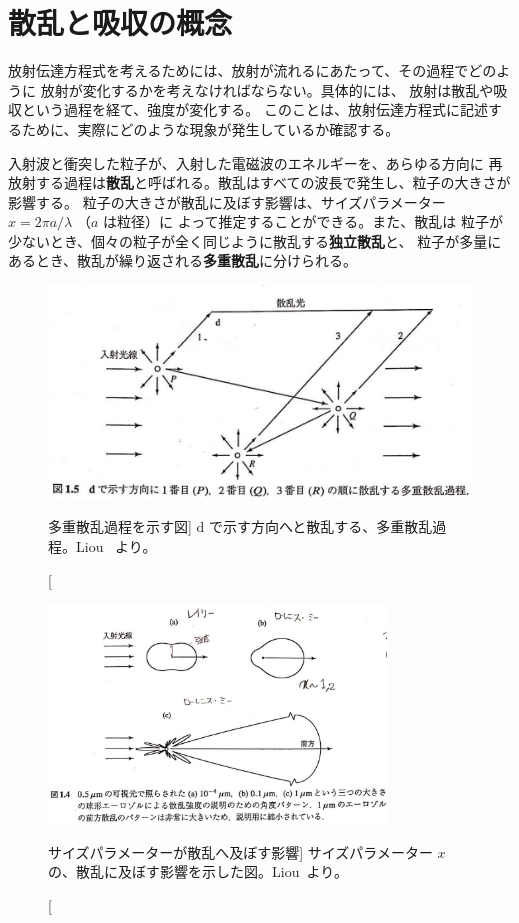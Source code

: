 \documentclass[book]{dennou777}
\newcommand{\hmemph}[1]{\textbf{#1}}
\begin{document}
\section{散乱と吸収の概念}
放射伝達方程式を考えるためには、放射が流れるにあたって、その過程でどのように
放射が変化するかを考えなければならない。具体的には、
放射は散乱や吸収という過程を経て、強度が変化する。
このことは、放射伝達方程式に記述するために、実際にどのような現象が発生しているか確認する。

入射波と衝突した粒子が、入射した電磁波のエネルギーを、あらゆる方向に
再放射する過程は\hmemph{散乱}と呼ばれる。散乱はすべての波長で発生し、粒子の大きさが影響する。
粒子の大きさが散乱に及ぼす影響は、サイズパラメーター $x=2\pi a/\lambda$ （$a$ は粒径）に
よって推定することができる。また、散乱は
粒子が少ないとき、個々の粒子が全く同じように散乱する\hmemph{独立散乱}と、
粒子が多量にあるとき、散乱が繰り返される\hmemph{多重散乱}に分けられる。

\begin{figure}[t]
	\includegraphics[width=\linewidth]{mscatter.jpg}
	\caption
		[多重散乱過程を示す図]
		{$\mathrm{d}$ で示す方向へと散乱する、多重散乱過程。Liou~\cite{liou} より。}
\end{figure}
\begin{figure}[t]
	\includegraphics[width=0.8\textwidth]{scatter.jpg}
	\caption
		[サイズパラメーターが散乱へ及ぼす影響]
		{サイズパラメーター $x$ の、散乱に及ぼす影響を示した図。Liou~\cite{liou}より。}
\end{figure}
\end{document}

